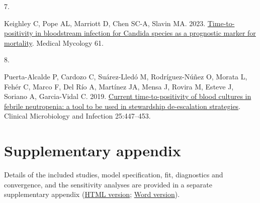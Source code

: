 \documentclass[
  11pt,
]{article}
\newlength{\cslhangindent}
\newlength{\csllabelwidth}
\newenvironment{CSLReferences}[2] %
 {\begin{list}{}{%
  \setlength{\itemindent}{0pt}
  \setlength{\leftmargin}{0pt}
  \setlength{\parsep}{0pt}
  \ifodd #1
   \setlength{\leftmargin}{\cslhangindent}
   \setlength{\itemindent}{-1\cslhangindent}
  \fi
  \setlength{\itemsep}{#2\baselineskip}}}
 {\end{list}}
\newcommand{\CSLLeftMargin}[1]{\parbox[t]{\csllabelwidth}{\strut#1\strut}}
\newcommand{\CSLRightInline}[1]{\parbox[t]{\linewidth - \csllabelwidth}{\strut#1\strut}}
\begin{document}
\begin{CSLReferences}{0}{1}
\CSLLeftMargin{7. }%
\CSLRightInline{Keighley C, Pope AL, Marriott D, Chen SC-A, Slavin MA.
2023. \href{https://doi.org/10.1093/mmy/myad028}{{Time-to-positivity in
bloodstream infection for Candida species as a prognostic marker for
mortality}}. Medical Mycology 61.}

\CSLLeftMargin{8. }%
\CSLRightInline{Puerta-Alcalde P, Cardozo C, Suárez-Lledó M,
Rodríguez-Núñez O, Morata L, Fehér C, Marco F, Del Río A, Martínez JA,
Mensa J, Rovira M, Esteve J, Soriano A, Garcia-Vidal C. 2019.
\href{https://doi.org/10.1016/j.cmi.2018.07.026}{{Current
time-to-positivity of blood cultures in febrile neutropenia: a tool to
be used in stewardship de-escalation strategies}}. Clinical Microbiology
and Infection 25:447--453.}

\end{CSLReferences}

\section*{Supplementary appendix}\label{supplementary-appendix}

Details of the included studies, model specification, fit, diagnostics
and convergence, and the sensitivity analyses are provided in a separate
supplementary appendix (\href{appendix-preview.html}{HTML version};
\href{downloads/appendix.docx}{Word version}).
\end{document}
